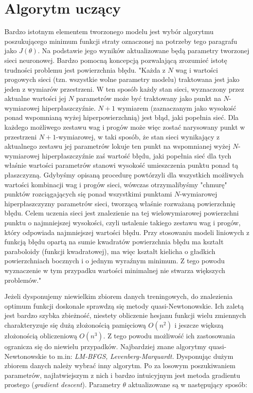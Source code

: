 \documentclass[11pt]{book}
\theoremstyle{definition}
\begin{document}
\section{Algorytm uczący}
\label{alg_ucz}

Bardzo istotnym elementem tworzonego modelu jest wybór algorytmu poszukującego minimum funkcji straty oznaczonej na potrzeby tego paragrafu jako $J(\theta)$. Na podstawie jego wyników aktualizowane będą parametry tworzonej sieci neuronowej. Bardzo pomocną koncepcją pozwalającą zrozumieć istotę trudności problemu jest powierzchnia błędu. "Każda z $N$ wag i wartości progowych sieci (tzn. wszystkie wolne parametry modelu) traktowana jest jako jeden z wymiarów przestrzeni. W ten sposób każdy stan sieci, wyznaczony przez aktualne wartości jej $N$ parametrów może być traktowany jako punkt na $N$-wymiarowej hiperpłaszczyźnie. $N+1$ wymiarem (zaznaczanym jako wysokość ponad wspomnianą wyżej hiperpowierzchnią) jest błąd, jaki popełnia sieć. Dla każdego możliwego zestawu wag i progów może więc zostać narysowany punkt w przestrzeni $N+1$-wymiarowej, w taki sposób, że stan sieci wynikający z aktualnego zestawu jej parametrów lokuje ten punkt na wspomnianej wyżej $N$-wymiarowej hiperpłaszczyźnie zaś wartość błędu, jaki popełnia sieć dla tych właśnie wartości parametrów stanowi wysokość umieszczenia punktu ponad tą płaszczyzną. Gdybyśmy opisaną procedurę powtórzyli dla wszystkich możliwych wartości kombinacji wag i progów sieci, wówczas otrzymalibyśmy "chmurę" punktów rozciągających się ponad wszystkimi punktami $N$-wymiarowej hiperpłaszczyzny parametrów sieci, tworzącą właśnie rozważaną powierzchnię błędu. Celem uczenia sieci jest znalezienie na tej wielowymiarowej powierzchni punktu o najmniejszej wysokości, czyli ustalenie takiego zestawu wag i progów, który odpowiada najmniejszej wartości błędu. Przy stosowaniu modeli liniowych z funkcją błędu opartą na sumie kwadratów powierzchnia błędu ma kształt paraboloidy (funkcji kwadratowej), ma więc kształt kielicha o gładkich powierzchniach bocznych i o jednym wyraźnym minimum. Z tego powodu wyznaczenie w tym przypadku wartości minimalnej nie stwarza większych problemów."\cite{Statsoft}

Jeżeli dysponujemy niewielkim zbiorem danych treningowych, do znalezienia optimum funkcji doskonale sprawdzą się metody quasi-Newtonowskie. Ich zaletą jest bardzo szybka zbieżność, niestety obliczenie hesjanu funkcji wielu zmiennych charakteryzuje się dużą złożonością pamięciową $O(n^2)$ i jeszcze większą złożonością obliczeniową $O(n^3)$. Z tego powodu możliwość ich zastosowania ogranicza się do niewielu przypadków. Najbardziej znane algorytmy quasi-Newtonowskie to m.in: \textit{LM-BFGS, Levenberg-Marquardt.} Dysponując dużym zbiorem danych należy wybrać inny algorytm. Po za losowym poszukiwaniem parametrów, najłatwiejszym z nich i bardzo intuicyjnym jest metoda gradientu prostego (\textit{gradient descent}). Parametry $\theta$ aktualizowane są w następujący sposób:
\end{document}
